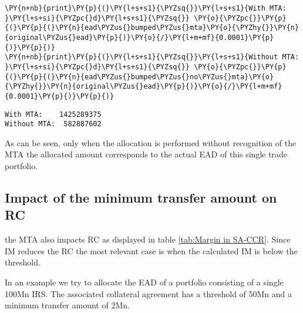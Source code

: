     \begin{tcolorbox}[breakable, size=fbox, boxrule=1pt, pad at break*=1mm,colback=cellbackground, colframe=cellborder]
\begin{Verbatim}[commandchars=\\\{\}]
\PY{n+nb}{print}\PY{p}{(}\PY{l+s+s1}{\PYZsq{}}\PY{l+s+s1}{With MTA:    }\PY{l+s+si}{\PYZpc{}d}\PY{l+s+s1}{\PYZsq{}} \PY{o}{\PYZpc{}}\PY{p}{(}\PY{p}{(}\PY{n}{ead\PYZus{}bumped\PYZus{}mta}\PY{o}{\PYZhy{}}\PY{n}{original\PYZus{}ead}\PY{p}{)}\PY{o}{/}\PY{l+m+mf}{0.0001}\PY{p}{)}\PY{p}{)}
\PY{n+nb}{print}\PY{p}{(}\PY{l+s+s1}{\PYZsq{}}\PY{l+s+s1}{Without MTA:  }\PY{l+s+si}{\PYZpc{}d}\PY{l+s+s1}{\PYZsq{}} \PY{o}{\PYZpc{}}\PY{p}{(}\PY{p}{(}\PY{n}{ead\PYZus{}bumped\PYZus{}no\PYZus{}mta}\PY{o}{\PYZhy{}}\PY{n}{original\PYZus{}ead}\PY{p}{)}\PY{o}{/}\PY{l+m+mf}{0.0001}\PY{p}{)}\PY{p}{)}
\end{Verbatim}
\end{tcolorbox}

    \begin{Verbatim}[commandchars=\\\{\}]
With MTA:    1425289375
Without MTA:  582887602
    \end{Verbatim}

    As can be seen, only when the allocation is performed without
recognition of the MTA the allocated amount corresponds to the actual
EAD of this single trade portfolio.

    \hypertarget{impact-of-the-minimum-transfer-amount-on-rc}{%
\subsection{Impact of the minimum transfer amount on
RC}\label{impact-of-the-minimum-transfer-amount-on-rc}}

the MTA also impacts RC as displayed in table
\ref{tab:Margin in SA-CCR}. Since IM reduces the RC the most relevant
case is when the calculated IM is below the threshold.

In an example we try to allocate the EAD of a portfolio consisting of a
single 100Mn IRS. The associated collateral agreement has a threshold of
50Mn and a minimum transfer amount of 2Mn.

